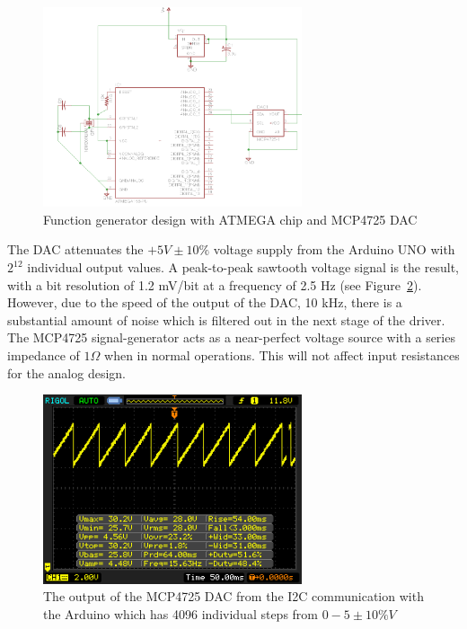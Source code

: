 \documentclass[12pt,journal]{IEEEtran}
\begin{document}
\begin{figure}
	\centering
	\includegraphics[width=3in]{./Function_generator.png}
	\caption{Function generator design with ATMEGA chip and MCP4725 DAC}
	\label{fig:function-generator}
\end{figure}

The DAC attenuates the $+5V \pm 10\%$ voltage supply from the Arduino UNO with $2^{12}$ individual output values. A peak-to-peak sawtooth voltage signal is the result, with a bit resolution of 1.2 mV/bit at a frequency of 2.5 Hz (see Figure~\ref{fig:five-volts-15-hz-wave}). However, due to the speed of the output of the DAC, 10 kHz, there is a substantial amount of noise which is filtered out in the next stage of the driver. The MCP4725 signal-generator acts as a near-perfect voltage source with a series impedance of $1\Omega$ when in normal operations. This will not affect input resistances for the analog design.  

\begin{figure}[h!]
  \centering
	\includegraphics[width=3in]{./data/dac-output-waveform.png}
	\caption[Cavity Mounts]{The output of the MCP4725 DAC from the I2C communication with the Arduino which has 4096 individual steps from $0-5 \pm 10\% V$}
	\label{fig:five-volts-15-hz-wave}
\end{figure}

\end{document}

